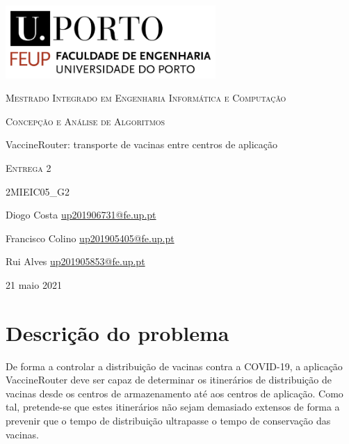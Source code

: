 \documentclass[12pt,a4paper]{report}
\begin{document}
\begin{titlepage}
	\centering
	\includegraphics[width=0.6\textwidth]{../feup.png}\par\vspace{1cm}
	{\scshape Mestrado Integrado em Engenharia Informática e Computação \par}
	\vspace{1cm}
	{\scshape Concepção e Análise de Algoritmos \par}
	\vspace{1.5cm}
	{\huge VaccineRouter: transporte de vacinas entre centros de aplicação \par}
	\vspace{1cm}
	{\scshape Entrega 2}
	\vspace{4cm}
	
	{\scshape 2MIEIC05\_G2 \par}
	\vspace{0.5cm}

	{ Diogo Costa \href{mailto:up201906731@fe.up.pt}{up201906731@fe.up.pt} \par}
	{ Francisco Colino \href{mailto:up201905405@fe.up.pt}{up201905405@fe.up.pt} \par}
	{ Rui Alves \href{mailto:up201905853@fe.up.pt}{up201905853@fe.up.pt} \par}
	\vspace{2cm}
	

	{\large 21 maio 2021\par}
\end{titlepage}


\tableofcontents{}
\newpage
\listoffigures
\newpage

\chapter{Descrição do problema}
De forma a controlar a distribuição de vacinas contra a COVID-19, a aplicação VaccineRouter deve ser capaz de determinar os itinerários de distribuição de vacinas desde os centros de armazenamento até aos centros de aplicação. Como tal, pretende-se que estes itinerários não sejam demasiado extensos de forma a prevenir que o tempo de distribuição ultrapasse o tempo de conservação das vacinas.
\end{document}
